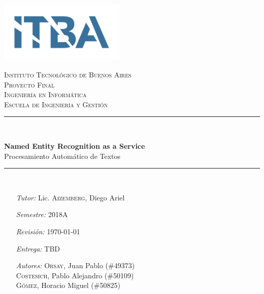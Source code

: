 \begin{titlepage}
\thispagestyle{empty}
\newcommand{\HRule}{\rule{\linewidth}{0.5mm}}
\hspace{1cm}
\center

\includegraphics[width = 60mm]{images/itba.png}

\textsc{\Large Instituto Tecnol\'ogico de Buenos Aires}\\[1.4cm]

\textsc{\huge Proyecto Final}\\[0.8cm]
\MSonehalfspacing
\textsc{\Large Ingenier\'ia en Inform\'atica}\\
\textsc{\large Escuela de Ingenier\'ia y Gesti\'on}\\[1.0cm]

\HRule\\[0.4cm]
\MSdoublespacing

{ \huge \bfseries Named Entity Recognition as a Service}\\[0.2cm]
{ \large Procesamiento Autom\'atico de Textos }\\[0.3cm]

\HRule \\[2.4cm]
\MSonehalfspacing

\begin{minipage}[t]{0.8\textwidth}
	\begin{itemize}
	\item[\emph{Tutor:}] Lic. \textsc{Aizemberg}, Diego Ariel
	\item[\emph{Semestre:}] 2018A
	\item[\emph{Revisión:}] \today
    \item[\emph{Entrega:}] TBD
    \item[\emph{Autores:}]
    	\textsc{Orsay}, Juan Pablo (\#49373) \\
    	\textsc{Costesich}, Pablo Alejandro (\#50109) \\
    	\textsc{G\'omez}, Horacio Miguel (\#50825)
    \end{itemize}
\end{minipage}
\end{titlepage}

\restoregeometry
{}
\null\vspace{\fill}
\begin{abstract}
\end{abstract}

